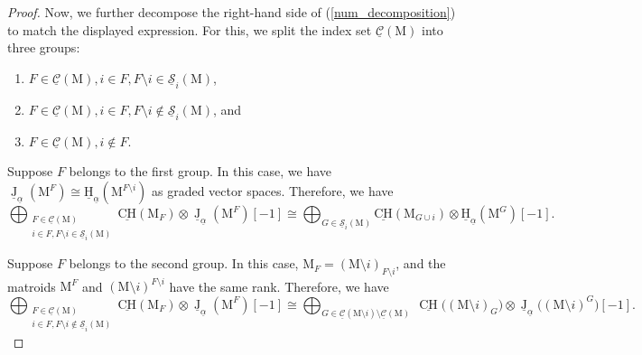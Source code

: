 \documentclass[11pt,reqno]{amsart}
\theoremstyle{definition}
\theoremstyle{remark}
\renewcommand{\(}{\left(}
\renewcommand{\)}{\right)}
\newcommand{\<}{\left<}
\renewcommand{\>}{\right>}
\newcommand{\uJ}{\underline{\operatorname{J}}}
\newcommand{\CH}{\operatorname{CH}}
\newcommand{\uCH}{\underline{\CH}}
\begin{document}
\begin{proof}
Now, we further decompose the right-hand side of (\ref{num_decomposition}) to match the displayed expression.
For this, we split the index set $\underline{\mathscr{C}}(\mathrm{M})$ into three groups:
\begin{enumerate}[(1)]\itemsep 5pt
\item $F\in \underline{\mathscr{C}}({\mathrm{M}}), i\in F, F\setminus i \in \underline{\mathscr{S}}_i({\mathrm{M}})$,
\item $F\in \underline{\mathscr{C}}({\mathrm{M}}), i\in F, F\setminus i \notin \underline{\mathscr{S}}_i({\mathrm{M}})$, and
\item $F\in \underline{\mathscr{C}}({\mathrm{M}}), i\notin F$.
\end{enumerate}

Suppose $F$ belongs to the first group.
In this case, we have $\uJ_{\underline\alpha}(\mathrm{M}^{F})\cong\underline{\mathrm{H}}_{\underline{\alpha}}(\mathrm{M}^{F \setminus i})$ as graded vector spaces.
Therefore, we have 
\[
\bigoplus_{\substack{F \in \underline{\mathscr{C}}(\mathrm{M})\\ i\in F, F\setminus i \in \underline{\mathscr{S}}_i(\mathrm{M})}} \underline{\mathrm{CH}}(\mathrm{M}_{F}) \otimes \uJ_{\underline\alpha}(\mathrm{M}^{F})[-1]
\cong 
\bigoplus_{G \in \underline{\mathscr{S}}_i(\mathrm{M})} \underline{\mathrm{CH}}(\mathrm{M}_{G\cup i}) \otimes  \underline{\mathrm{H}}_{\underline{\alpha}}(\mathrm{M}^G)[-1].
\]

Suppose $F$ belongs to the second group.
In this case,  $\mathrm{M}_F=(\mathrm{M}\setminus i)_{F\setminus i}$, 
and the matroids $\mathrm{M}^{F}$ and $(\mathrm{M}\setminus i)^{F\setminus i}$ have the same rank.
Therefore, we have
\[
\bigoplus_{\substack{F \in \underline{\mathscr{C}}(\mathrm{M})\\ i\in F, F\setminus i \notin \underline{\mathscr{S}}_i(\mathrm{M})}} \underline{\mathrm{CH}}(\mathrm{M}_{F}) \otimes \uJ_{\underline\alpha}(\mathrm{M}^{F})[-1]
\cong
\bigoplus_{G\in \underline{\mathscr{C}}({\mathrm{M}\setminus i}) \setminus \underline{\mathscr{C}}(\mathrm{M})}  \  \uCH\big((\mathrm{M}\setminus i)_G\big)\otimes \uJ_{\underline{\alpha}}\big((\mathrm{M}\setminus i)^G\big)[-1].
\]


\end{proof}
\end{document}
